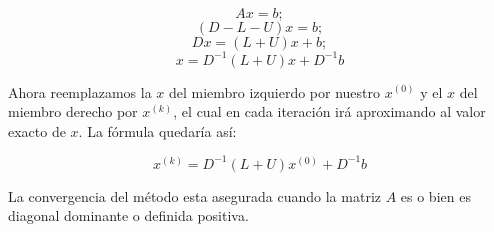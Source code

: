 \begin{displaymath}
Ax = b;
\end{displaymath}
\begin{displaymath}
(D - L - U)x = b;
\end{displaymath}
\begin{displaymath}
Dx = (L + U)x + b;
\end{displaymath}
\begin{displaymath}
x = D^{-1}(L + U)x + D^{-1}b
\end{displaymath}

Ahora reemplazamos la $x$ del miembro izquierdo por nuestro $x^{(0)}$ y el $x$ del miembro derecho por $x^{(k)}$, el cual en cada iteración irá aproximando al valor exacto de $x$. La fórmula quedaría así:

\begin{displaymath}
x^{(k)} = D^{-1}(L + U)x^{(0)} + D^{-1}b
\end{displaymath}

La convergencia del método esta asegurada cuando la matriz $A$ es o bien es diagonal dominante o definida positiva.

